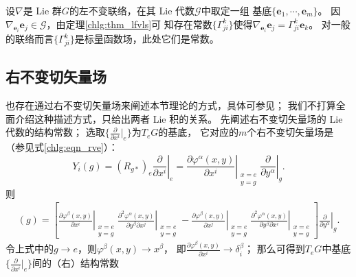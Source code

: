 设$\nabla$是 Lie 群$G$的左不变联络，在其 Lie 代数$\mathscr{G}$中取定一组
基底$\{\boldsymbol{e}_1,\cdots,\boldsymbol{e}_m\}$。
因$\nabla_{\boldsymbol{e}_i} \boldsymbol{e}_j \in \mathscr{G}$，由定理\ref{chlg:thm_lfvls}可
知存在{\kaishu 常数}$\{\Gamma^k_{ji}\}$使得$\nabla_{\boldsymbol{e}_i} \boldsymbol{e}_j= \Gamma^k_{ji} \boldsymbol{e}_k$。
对一般的联络而言$\{\Gamma^k_{ji}\}$是标量函数场，此处它们是{\kaishu 常数}。







\subsection{右不变切矢量场}
也存在通过右不变切矢量场来阐述本节理论的方式，具体可参见\parencite[\S 6.1]{cc2001-zh}；
我们不打算全面介绍这种描述方式，只给出两者 Lie 积的关系。
先阐述右不变切矢量场的 Lie 代数的结构常数；
选取$\{\frac{\partial}{\partial x^i}|_{e}\}$为$T_eG$的基底，
它对应的$m$个右不变切矢量场是（参见式\eqref{chlg:eqn_rve}）：
\begin{equation}
    Y_i(g)=(R_{g*})_e \left. \frac{\partial }{\partial x^i }\right|_{e}
    = \left. \frac{\partial \varphi^\alpha (x,y)}{\partial x^i} 
    \right|_{\substack{x=e\\y=g}}   \left. \frac{\partial}{\partial y^\alpha}\right|_{g} .
\end{equation}
则 
\begin{align*}
    [Y_i, Y_j](g)= \left[ \left. \frac{\partial \varphi^\beta (x,y)}{\partial x^i} \right|_{\substack{x=e\\y=g}}
    \left. \frac{\partial^2 \varphi^\alpha (x,y)}{\partial y^\beta \partial x^j} \right|_{\substack{x=e\\y=g}} 
    - \left. \frac{\partial \varphi^\beta (x,y)}{\partial x^j} \right|_{\substack{x=e\\y=g}}
    \left. \frac{\partial^2 \varphi^\alpha (x,y)}{\partial y^\beta \partial x^i} \right|_{\substack{x=e\\y=g}} 
    \right] \left. \frac{\partial}{\partial y^\alpha}\right|_{g} .
\end{align*}
令上式中的$g\to e$，则$\varphi^\beta(x,y) \to x^\beta$，
即$\frac{\partial \varphi^\beta (x,y)}{\partial x^i}\to \delta^\beta_i$；
那么可得到$T_eG$中基底$\{\frac{\partial}{\partial x^i}|_{e}\}$间的（右）结构常数
